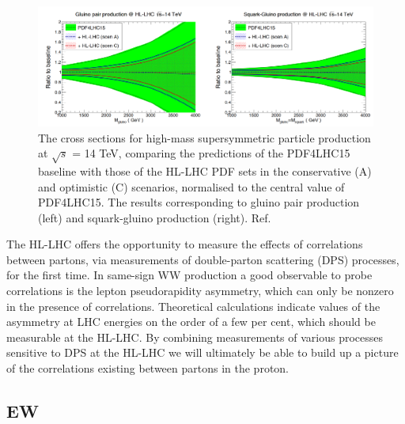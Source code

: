 \documentclass{article}
\begin{document}
\begin{figure}
\centering
\includegraphics[width=1.0\textwidth]{UltimatePDF_gluino_squark.pdf}
\caption{\label{Fig:HLLHC_kin} The cross sections for high-mass supersymmetric particle production at $\sqrt{s}$ = 14 TeV, comparing the predictions of the PDF4LHC15 baseline with those of the HL-LHC PDF sets in the conservative (A) and optimistic (C) scenarios, normalised to the central value of PDF4LHC15. The results corresponding to gluino pair production (left) and squark-gluino production (right). Ref.~\cite{Khalek:2018mdn}}
\end{figure}

\vspace{5mm}
\noindent
The HL-LHC offers the opportunity to measure the effects of correlations between partons, via measurements of double-parton scattering (DPS) processes, for the first time. In same-sign WW production a good
observable to probe correlations is the lepton pseudorapidity asymmetry, which can only be nonzero in the presence of correlations. Theoretical calculations indicate values of the asymmetry at LHC energies on the
order of a few per cent, which should be measurable at the HL-LHC. By combining measurements of various processes sensitive to DPS at the HL-LHC we will ultimately be able to build up a picture of the correlations existing between partons in the proton.

\subsection{EW}
\end{document}
